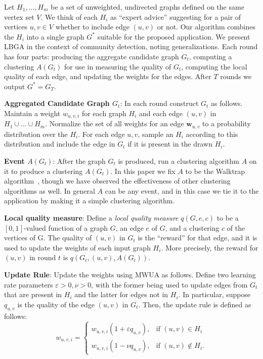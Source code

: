 \documentclass{article}
\begin{document}
Let $H_1, \dots, H_m$ be a set of unweighted, undirected graphs defined on the
same vertex set $V$. We think of each $H_i$ as ``expert advice'' suggesting for
a pair of vertices $u,v \in V$ whether to include edge $(u,v)$ or not. Our
algorithm combines the $H_i$ into a single graph $G^*$ suitable for the
proposed application. We present LBGA in the context of community detection,
noting generalizations. Each round has four parts: producing the aggregate
candidate graph $G_t$, computing a clustering $A(G_t)$ for use in measuring the
quality of $G_t$, computing the local quality of each edge, and updating the
weights for the edges. After $T$ rounds we output $G^* = G_T$.

\textbf{Aggregated Candidate Graph $G_t$}: In each round construct $G_t$ as
follows. Maintain a weight $w_{u,v,i}$ for each graph $H_i$ and each edge
$(u,v)$ in $H_1 \cup \dots \cup H_m$. Normalize the set of all weights for an
edge $\mathbf{w}_{u,v}$ to a probability distribution over the $H_i$. For each
edge $u,v$, sample an $H_i$ according to this distribution and include the edge
in $G_t$ if it is present in the drawn $H_i$. 

\textbf{Event $A(G_t)$}: After the graph $G_t$ is produced, run a clustering
algorithm $A$ on it to produce a clustering $A(G_t)$. In this paper we fix $A$
to be the Walktrap algorithm~\cite{Walktrap}, though we have observed the
effectiveness of other clustering algorithms as well. In general $A$ can be any
event, and in this case we tie it to the application by making it a simple
clustering algorithm.

\textbf{Local quality measure}: Define a \emph{local quality measure}
$q(G,e,c)$ to be a $[0,1]$-valued function of a graph $G$, an edge $e$ of $G$,
and a clustering $c$ of the vertices of G. The quality of $(u,v)$ in $G_t$ is
the ``reward'' for that edge, and it is used to update the weights of each
input graph $H_i$.  More precisely, the reward for $(u,v)$ in round $t$ is
$q(G_t, (u,v),A(G_t))$.

\textbf{Update Rule}: Update the weights using MWUA as follows. Define two
learning rate parameters $\varepsilon > 0, \nu > 0$, with the former being used
to update edges from $G_t$ that are present in $H_i$ and the latter for edges
not in $H_i$. In particular, suppose $q_{u,v}$ is the quality of the edge
$(u,v)$ in $G_t$. Then, the update rule is defined as follows:
\[
w_{u,v,i}=
\begin{cases}
w_{u,v,i}(1 +\varepsilon q_{u,v}), & \text{if } (u,v) \in H_i \\
w_{u,v,i}(1 - \nu q_{u,v}), & \text{if } (u,v) \not \in H_i .
\end{cases}
\]
\end{document}
